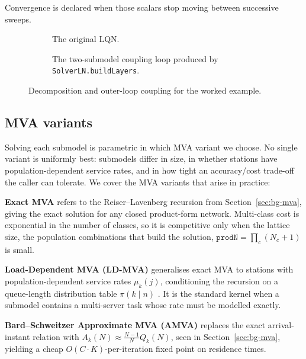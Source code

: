 Convergence is declared when those scalars stop moving between successive sweeps. 

\begin{figure}[h]
  \centering
  \begin{subfigure}[c]{0.26\textwidth}
    \centering
    
    \caption{The original LQN.}
    \label{fig:bg-two-submodel-lqn}
  \end{subfigure}%
  \hspace{0.03\textwidth}%
  \begin{subfigure}[c]{0.70\textwidth}
    \centering
    \resizebox{\textwidth}{!}{}
    \caption{The two-submodel coupling loop produced by
      \texttt{SolverLN.buildLayers}.}
    \label{fig:bg-two-submodel-coupling}
  \end{subfigure}
  \caption[Two-submodel ensemble decomposition and coupling for the worked example]{
    Decomposition and outer-loop coupling for the worked example.
  }
  \label{fig:bg-two-submodel-example}
\end{figure}

\subsection{MVA variants} 
\label{sec:lqn-mva-variants}

Solving each submodel is parametric in which MVA variant we choose. No single variant is uniformly best: submodels differ in size, in whether stations have population-dependent service rates, and in how tight an accuracy/cost trade-off the caller can tolerate. We cover the MVA variants that arise in practice:

\textbf{Exact MVA} refers to the Reiser–Lavenberg recursion \cite{reiser80} from Section~\ref{sec:bg-mva}, giving the exact solution for any closed product-form network. Multi-class cost is exponential in the number of classes, so it is competitive only when the lattice size, the population combinations that build the solution, $\texttt{prodN} = \prod_c (N_c + 1)$ is small.

\textbf{Load-Dependent MVA (LD-MVA)} \cite{reiser81} generalises exact MVA to stations with population-dependent service rates $\mu_k(j)$, conditioning the recursion on a queue-length distribution table $\pi(k \mid n)$ \cite{lazowska84}. It is the standard kernel when a submodel contains a multi-server task whose rate must be modelled exactly.

\textbf{Bard–Schweitzer Approximate MVA (AMVA)} \cite{bard79} replaces the exact arrival-instant relation with $A_k(N) \approx \frac{N - 1}{N} Q_k(N)$, seen in Section~\ref{sec:bg-mva}, yielding a cheap $O(C \cdot K)$-per-iteration fixed point on residence times.

